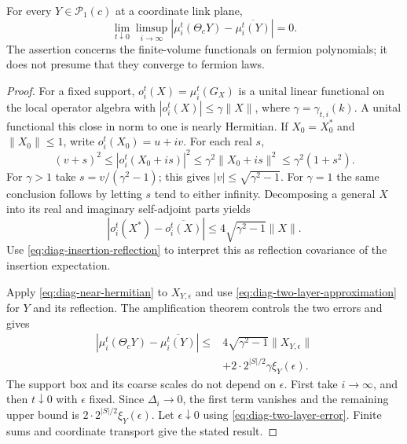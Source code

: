 \begin{proposition}\label{prop:diag-two-layer-principle}
For every $Y\in\mathcal P_1(c)$ at a coordinate link plane,
\begin{equation}\label{eq:diag-two-layer-principle}
 \lim_{t\downarrow0}\limsup_{i\to\infty}
    |\mu_i^t(\Theta_cY)-\overline{\mu_i^t(Y)}|=0.
\end{equation}
The assertion concerns the finite-volume functionals on fermion
polynomials; it does not presume that they converge to fermion
laws.
\end{proposition}

\begin{proof}
For a fixed support, $o_i^t(X)=\mu_i^t(G_X)$ is a unital linear
functional on the local operator algebra with
$|o_i^t(X)|\le\gamma\|X\|$, where
$\gamma=\gamma_{t,i}(k)$. A unital functional this close in norm
to one is nearly Hermitian. If $X_0=X_0^*$ and $\|X_0\|\le1$,
write $o_i^t(X_0)=u+iv$. For each real $s$,
\[
 (v+s)^2\le |o_i^t(X_0+is)|^2
            \le\gamma^2\|X_0+is\|^2
            \le\gamma^2(1+s^2).
\]
For $\gamma>1$ take $s=v/(\gamma^2-1)$; this gives
$|v|\le\sqrt{\gamma^2-1}$. For $\gamma=1$ the same conclusion
follows by letting $s$ tend to either infinity. Decomposing a
general $X$ into its real and imaginary self-adjoint parts yields
\begin{equation}\label{eq:diag-near-hermitian}
 |o_i^t(X^*)-\overline{o_i^t(X)}|
           \le4\sqrt{\gamma^2-1}\|X\|.
\end{equation}
Use \eqref{eq:diag-insertion-reflection} to interpret this as
reflection covariance of the insertion expectation.

Apply \eqref{eq:diag-near-hermitian} to $X_{Y,\epsilon}$ and
use \eqref{eq:diag-two-layer-approximation} for $Y$ and its
reflection. The amplification theorem controls the two errors
and gives
\begin{equation}\label{eq:diag-two-layer-finite-error}
 \begin{split}
 |\mu_i^t(\Theta_cY)-\overline{\mu_i^t(Y)}|
 \le{}&4\sqrt{\gamma^2-1}\|X_{Y,\epsilon}\|\\
      &+2\cdot2^{|S|/2}\gamma\xi_Y(\epsilon).
 \end{split}
\end{equation}
The support box and its coarse scales do not depend on
$\epsilon$. First take $i\to\infty$, and then $t\downarrow0$
with $\epsilon$ fixed. Since $\Delta_i\to0$, the first term
vanishes and the remaining upper bound is
$2\cdot2^{|S|/2}\xi_Y(\epsilon)$. Let $\epsilon\downarrow0$
using \eqref{eq:diag-two-layer-error}. Finite sums and coordinate
transport give the stated result.
\end{proof}

